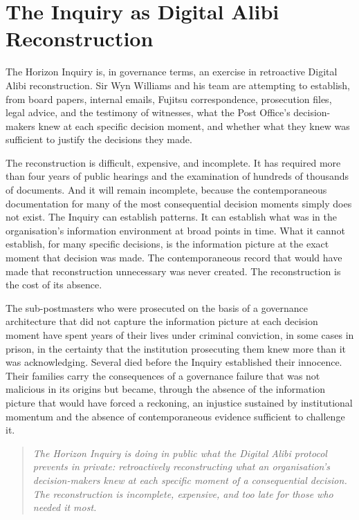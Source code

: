 \scenebreak

\section{The Inquiry as Digital Alibi Reconstruction}

The Horizon Inquiry is, in governance terms, an exercise in retroactive Digital Alibi reconstruction. Sir Wyn Williams and his team are attempting to establish, from board papers, internal emails, Fujitsu correspondence, prosecution files, legal advice, and the testimony of witnesses, what the Post Office's decision-makers knew at each specific decision moment, and whether what they knew was sufficient to justify the decisions they made.

The reconstruction is difficult, expensive, and incomplete. It has required more than four years of public hearings and the examination of hundreds of thousands of documents. And it will remain incomplete, because the contemporaneous documentation for many of the most consequential decision moments simply does not exist. The Inquiry can establish patterns. It can establish what was in the organisation's information environment at broad points in time. What it cannot establish, for many specific decisions, is the information picture at the exact moment that decision was made. The contemporaneous record that would have made that reconstruction unnecessary was never created. The reconstruction is the cost of its absence.

The sub-postmasters who were prosecuted on the basis of a governance architecture that did not capture the information picture at each decision moment have spent years of their lives under criminal conviction, in some cases in prison, in the certainty that the institution prosecuting them knew more than it was acknowledging. Several died before the Inquiry established their innocence. Their families carry the consequences of a governance failure that was not malicious in its origins but became, through the absence of the information picture that would have forced a reckoning, an injustice sustained by institutional momentum and the absence of contemporaneous evidence sufficient to challenge it.

\begin{quote}
\emph{The Horizon Inquiry is doing in public what the Digital Alibi protocol prevents in private: retroactively reconstructing what an organisation's decision-makers knew at each specific moment of a consequential decision. The reconstruction is incomplete, expensive, and too late for those who needed it most.}
\end{quote}

